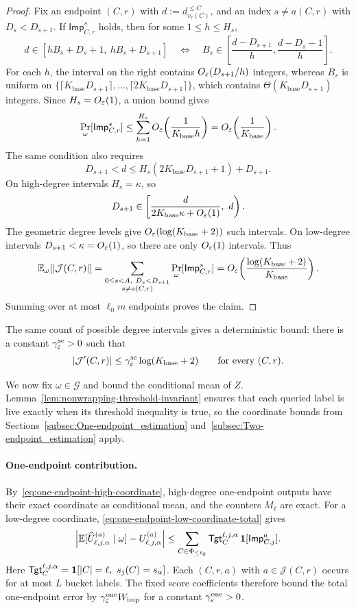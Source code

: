\begin{proof}
Fix an endpoint $(C,r)$ with $d:=d_{v_r(C)}^{\le C}$, and an index $s\neq a(C,r)$ with $D_s<D_{s+1}$.
If $\mathsf{Imp}^{s}_{C,r}$ holds, then for some $1\le h\le H_s$,
\[
d\in[hB_s+D_s+1,\ hB_s+D_{s+1}]
\quad\Longleftrightarrow\quad
B_s\in\left[\frac{d-D_{s+1}}h,\frac{d-D_s-1}h\right].
\]
For each $h$, the interval on the right contains $O_\varepsilon(D_{s+1}/h)$ integers, whereas $B_s$ is uniform on $\{\lceil K_{\mathrm{base}}D_{s+1}\rceil,\ldots,\lceil2K_{\mathrm{base}}D_{s+1}\rceil\}$, which contains $\Theta(K_{\mathrm{base}}D_{s+1})$ integers.
Since $H_s=O_\varepsilon(1)$, a union bound gives
\[
\Pr_\omega[\mathsf{Imp}^{s}_{C,r}]
\le\sum_{h=1}^{H_s}O_\varepsilon\!\left(\frac1{K_{\mathrm{base}}h}\right)
=O_\varepsilon\!\left(\frac1{K_{\mathrm{base}}}\right).
\]
The same condition also requires
\[
D_{s+1}<d\le H_s(2K_{\mathrm{base}}D_{s+1}+1)+D_{s+1}.
\]
On high-degree intervals $H_s=\kappa$, so
\[
D_{s+1}\in\left[\frac{d}{2K_{\mathrm{base}}\kappa+O_\eps(1)},\ d\right).
\]
The geometric degree levels give $O_\varepsilon(\log(K_{\mathrm{base}}+2))$ such intervals.
On low-degree intervals $D_{s+1}<\kappa=O_\varepsilon(1)$, so there are only $O_\varepsilon(1)$ intervals.
Thus
\[
\mathbb E_\omega[|\mathcal J(C,r)|]
=\sum_{\substack{0\le s<A,\ D_s<D_{s+1}\\s\neq a(C,r)}}
\Pr_\omega[\mathsf{Imp}^{s}_{C,r}]
=O_\varepsilon\!\left(\frac{\log(K_{\mathrm{base}}+2)}{K_{\mathrm{base}}}\right).
\]
Summing over at most $\ell_0m$ endpoints proves the claim.
\end{proof}

The same count of possible degree intervals gives a deterministic bound: there is a constant $\gamma^{\mathrm{sc}}_\varepsilon>0$ such that
\begin{equation}\label{eq:maxksat-visible-scale-count}
|\mathcal J'(C,r)|\le\gamma^{\mathrm{sc}}_\varepsilon\log(K_{\mathrm{base}}+2)
\qquad\text{for every }(C,r).
\end{equation}

We now fix $\omega\in\mathcal G$ and bound the conditional mean of $Z$.
Lemma~\ref{lem:nonwrapping-threshold-invariant} ensures that each queried label is live exactly when its threshold inequality is true, so the coordinate bounds from Sections~\ref{subsec:One-endpoint_estimation} and~\ref{subsec:Two-endpoint_estimation} apply.

\paragraph{One-endpoint contribution.}
By~\eqref{eq:one-endpoint-high-coordinate}, high-degree one-endpoint outputs have their exact coordinate as conditional mean, and the counters $M_\ell$ are exact.
For a low-degree coordinate, \eqref{eq:one-endpoint-low-coordinate-total} gives
\[
\left|\mathbb E[\widehat U^{(a)}_{\ell,j,\alpha}\mid\omega]-U^{(a)}_{\ell,j,\alpha}\right|
\le\sum_{C\in\Phi_{\le\ell_0}}
\mathsf{Tgt}^{\ell,j,\alpha}_{C}\,\mathbf 1[\mathsf{Imp}^{a}_{C,j}].
\]
Here $\mathsf{Tgt}^{\ell,j,\alpha}_{C}=\1[|C|=\ell,\ s_j(C)=s_\alpha]$.
Each $(C,r,a)$ with $a\in\mathcal J(C,r)$ occurs for at most $L$ bucket labels.
The fixed score coefficients therefore bound the total one-endpoint error by $\gamma^{\mathrm{one}}_\varepsilon W_{\mathrm{imp}}$ for a constant $\gamma^{\mathrm{one}}_\varepsilon>0$.


